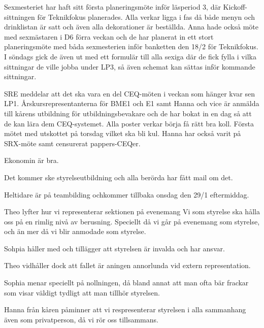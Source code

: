 \documentclass[10pt]{article}
\begin{document}
\begin{paragrafer}
\begin{paragrafer}
Sexmesteriet har haft sitt första planeringsmöte inför läsperiod 3, där Kickoff-sittningen för Teknikfokus planerades. Alla verkar ligga i fas då både menyn och drinklistan är satt och även alla dekorationer är beställda. Anna hade också möte med sexmästaren i D6 förra veckan och de har planerat in ett stort planeringsmöte med båda sexmesterien inför banketten den 18/2 för Teknikfokus. I söndags gick de även ut med ett formulär till alla sexiga där de fick fylla i vilka sittningar de ville jobba under LP3, så även schemat kan sättas inför kommande sittningar. 

SRE meddelar att det ska vara en del CEQ-möten i veckan som hänger kvar sen LP1. Årskursrepresentanterna för BME1 och E1 samt Hanna och vice är anmälda till kårens utbildning för utbildningsbevakare och de har bokat in en dag så att de kan lära dem CEQ-systemet. Alla poster verkar börja få rätt bra koll. Första mötet med utskottet på torsdag vilket ska bli kul. Hanna har också varit på SRX-möte samt censurerat pappers-CEQer.


 
Ekonomin är bra.


Det kommer ske styrelseutbildning och alla berörda har fått mail om det.

Heltidare är på teambilding ochkommer tillbaka onsdag den 29/1 eftermiddag.


\end{paragrafer}


Theo lyfter hur vi representerar sektionen på evenemang
Vi som styrelse ska hålla oss på en rimlig nivå av berusning.
Speciellt då vi går på evenemang som styrelse, och än mer då vi blir anmodade som styrelse.

Sohpia håller med och tillägger att styrelsen är invalda och har ansvar.

Theo vidhåller dock att fallet är aningen annorlunda vid extern representation.

Sophia menar speciellt på nollningen, då bland annat att man ofta bär frackar som visar väldigt tydligt att man tillhör styrelsen.

Hanna från kåren påminner att vi respresenterar styrelsen i alla sammanhang även som privatperson, då vi rör oss tillsammans.



\end{paragrafer}
\end{document}

